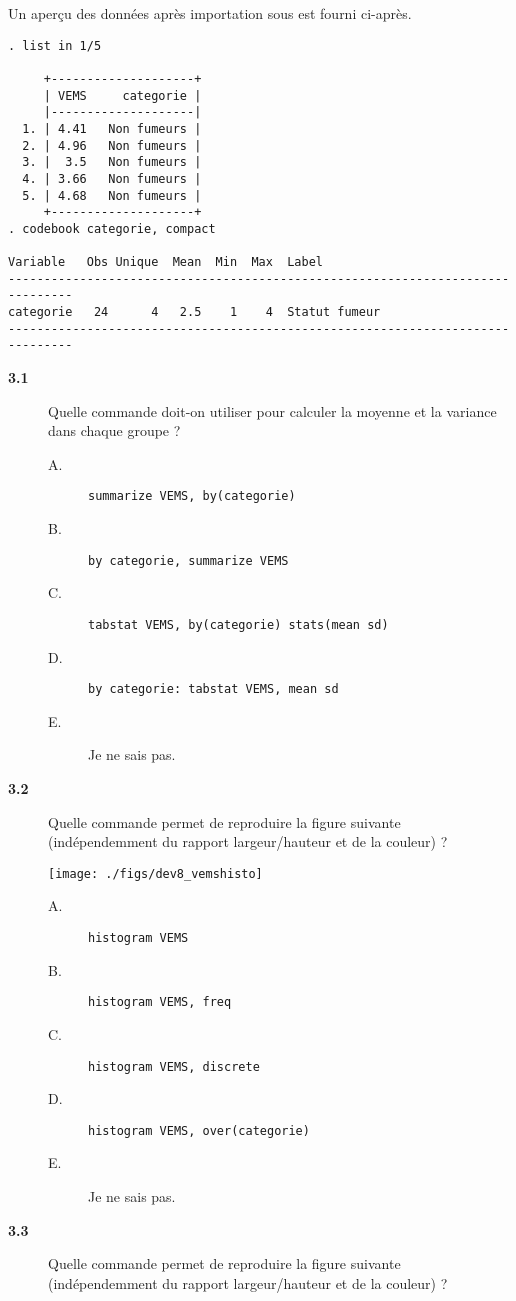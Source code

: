 Un aperçu des données après importation sous \Stata est fourni ci-après.
\begin{verbatim}
. list in 1/5

     +--------------------+
     | VEMS     categorie |
     |--------------------|
  1. | 4.41   Non fumeurs |
  2. | 4.96   Non fumeurs |
  3. |  3.5   Non fumeurs |
  4. | 3.66   Non fumeurs |
  5. | 4.68   Non fumeurs |
     +--------------------+
. codebook categorie, compact

Variable   Obs Unique  Mean  Min  Max  Label
-------------------------------------------------------------------------------
categorie   24      4   2.5    1    4  Statut fumeur
-------------------------------------------------------------------------------
\end{verbatim}
\begin{description}
\item[\bf 3.1] Quelle commande doit-on utiliser pour calculer la moyenne et
  la variance dans chaque groupe ? 
  \begin{description}
  \item[A.] \verb|summarize VEMS, by(categorie)|
  \item[B.] \verb|by categorie, summarize VEMS|
  \item[C.] \verb|tabstat VEMS, by(categorie) stats(mean sd)|
  \item[D.] \verb|by categorie: tabstat VEMS, mean sd|
  \item[E.] Je ne sais pas.
  \end{description}  
\item[\bf 3.2] Quelle commande permet de reproduire la figure suivante
  (indépendemment du rapport largeur/hauteur et de la couleur) ?
\begin{center}
  \texttt{[image: ./figs/dev8\_vemshisto]}
\end{center}
\begin{description}
\item[A.] \verb|histogram VEMS|
\item[B.] \verb|histogram VEMS, freq|
\item[C.] \verb|histogram VEMS, discrete|
\item[D.] \verb|histogram VEMS, over(categorie)|
\item[E.] Je ne sais pas.
\end{description}
\item[\bf 3.3] Quelle commande permet de reproduire la figure suivante
  (indépendemment du rapport largeur/hauteur et de la couleur) ?

\end{description}
